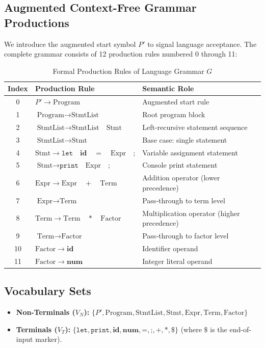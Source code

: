 \documentclass[11pt,a4paper]{article}
\begin{document}
\subsection{Augmented Context-Free Grammar Productions}
We introduce the augmented start symbol $P'$ to signal language acceptance. The complete grammar consists of 12 production rules numbered 0 through 11:

\begin{table}[h]
\centering
\small
\caption{Formal Production Rules of Language Grammar $G$}
\label{tab:grammar}
\begin{tabular}{cll}
\toprule
\textbf{Index} & \textbf{Production Rule} & \textbf{Semantic Role} \\
\midrule
0 & $P' \to \text{Program}$ & Augmented start rule \\
1 & $\text{Program} \to \text{StmtList}$ & Root program block \\
2 & $\text{StmtList} \to \text{StmtList} \quad \text{Stmt}$ & Left-recursive statement sequence \\
3 & $\text{StmtList} \to \text{Stmt}$ & Base case: single statement \\
4 & $\text{Stmt} \to \texttt{let} \quad \mathbf{id} \quad = \quad \text{Expr} \quad \texttt{;}$ & Variable assignment statement \\
5 & $\text{Stmt} \to \texttt{print} \quad \text{Expr} \quad \texttt{;}$ & Console print statement \\
6 & $\text{Expr} \to \text{Expr} \quad + \quad \text{Term}$ & Addition operator (lower precedence) \\
7 & $\text{Expr} \to \text{Term}$ & Pass-through to term level \\
8 & $\text{Term} \to \text{Term} \quad * \quad \text{Factor}$ & Multiplication operator (higher precedence) \\
9 & $\text{Term} \to \text{Factor}$ & Pass-through to factor level \\
10 & $\text{Factor} \to \mathbf{id}$ & Identifier operand \\
11 & $\text{Factor} \to \mathbf{num}$ & Integer literal operand \\
\bottomrule
\end{tabular}
\end{table}

\subsection{Vocabulary Sets}
\begin{itemize}
    \item \textbf{Non-Terminals ($V_N$):} $\{ P', \text{Program}, \text{StmtList}, \text{Stmt}, \text{Expr}, \text{Term}, \text{Factor} \}$
    \item \textbf{Terminals ($V_T$):} $\{ \texttt{let}, \texttt{print}, \mathbf{id}, \mathbf{num}, \texttt{=}, \texttt{;}, \texttt{+}, \texttt{*}, \mathbf{\$} \}$ (where $\mathbf{\$}$ is the end-of-input marker).
\end{itemize}
\end{document}

